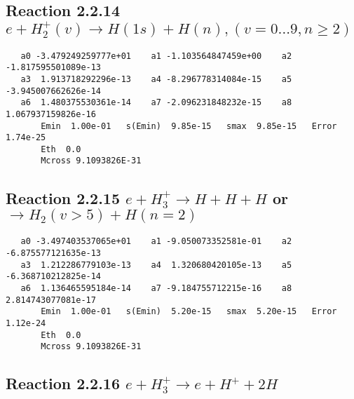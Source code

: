 \documentclass[12pt,dvipdfmx]{article}
\begin{document}
\newpage
\subsection{
Reaction 2.2.14 $   e + H_2^+(v) \rightarrow H(1s) + H(n), (v=0\ldots 9, n\geq 2)$}



\begin{small}\begin{verbatim}
   a0 -3.479249259777e+01    a1 -1.103564847459e+00    a2 -1.817595501089e-13
   a3  1.913718292296e-13    a4 -8.296778314084e-15    a5 -3.945007662626e-14
   a6  1.480375530361e-14    a7 -2.096231848232e-15    a8  1.067937159826e-16
       Emin  1.00e-01   s(Emin)  9.85e-15   smax  9.85e-15   Error  1.74e-25
       Eth  0.0
       Mcross 9.1093826E-31
\end{verbatim}\end{small}


\newpage
\subsection{
Reaction 2.2.15 $   e + H_3^+ \rightarrow  H + H + H$ or $\rightarrow H_2(v > 5) + H(n=2)$}





\begin{small}\begin{verbatim}
   a0 -3.497403537065e+01    a1 -9.050073352581e-01    a2 -6.875577121635e-13
   a3  1.212286779103e-13    a4  1.320680420105e-13    a5 -6.368710212825e-14
   a6  1.136465595184e-14    a7 -9.184755712215e-16    a8  2.814743077081e-17
       Emin  1.00e-01   s(Emin)  5.20e-15   smax  5.20e-15   Error  1.12e-24
       Eth  0.0
       Mcross 9.1093826E-31
\end{verbatim}\end{small}





\newpage
\subsection{
Reaction 2.2.16 $ e + H_3^+ \rightarrow e + H^+ + 2H$}
\end{document}
